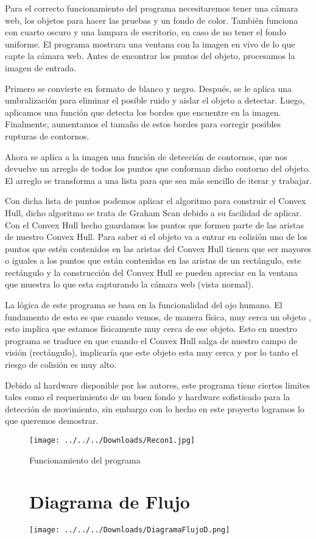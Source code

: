 \documentclass[12pt]{article}
\begin{document}
Para el correcto funcionamiento del programa necesitaremos tener una cámara web, los objetos para hacer las pruebas y un fondo de color. También funciona con cuarto oscuro y una lampara de escritorio, en caso de no tener el fondo uniforme. El programa mostrara una ventana con la imagen en vivo de lo que capte la cámara web. Antes de encontrar los puntos del objeto, procesamos la imagen de entrada.


Primero se convierte en formato de blanco y negro. Después, se le aplica una umbralización para eliminar el posible ruido y aislar el objeto a detectar. Luego, aplicamos una función que detecta los bordes que encuentre en la imagen. Finalmente, aumentamos el tamaño de estos bordes para corregir posibles rupturas de contornos.

Ahora se aplica a la imagen una función de detección de contornos, que nos devuelve un arreglo de todos los puntos que conforman dicho contorno del objeto. El arreglo se transforma a una lista para que sea más sencillo de iterar y trabajar.

Con dicha lista de puntos podemos aplicar el algoritmo para construir el Convex Hull, dicho algoritmo se trata de Graham Scan debido a su facilidad de aplicar. Con el Convex Hull hecho guardamos los puntos que formen parte de las aristas de nuestro Convex Hull. Para saber si el objeto va a entrar en colisión uno de los puntos que estén contenidos en las aristas del Convex Hull tienen que ser mayores o iguales a los puntos que están contenidas en las aristas de un rectángulo, este rectángulo y la construcción del Convex Hull se pueden apreciar en la ventana que muestra lo que esta capturando la cámara web (vista normal).

La lógica de este programa se basa en la funcionalidad del ojo humano. El fundamento de esto es que cuando vemos, de manera física, muy cerca un objeto , esto implica que estamos físicamente muy cerca de ese objeto. Esto en nuestro programa se traduce en que cuando el Convex Hull salga de nuestro campo de visión (rectángulo), implicaría que este objeto esta muy cerca y por lo tanto el riesgo de colisión es muy alto.

Debido al hardware disponible por los autores, este programa tiene ciertos limites tales como el requerimiento de un buen fondo y hardware sofisticado para la detección de movimiento, sin embargo con lo hecho en este proyecto logramos lo que queremos demostrar.\\
\begin{figure}[h]
\texttt{[image: ../../../Downloads/Recon1.jpg]}
\centering
\caption{Funcionamiento del programa}
\end{figure} 
\begin{figure}[h!]
\section{Diagrama de Flujo}
\centering
\texttt{[image: ../../../Downloads/DiagramaFlujoD.png]}
\end{figure}
\end{document}
